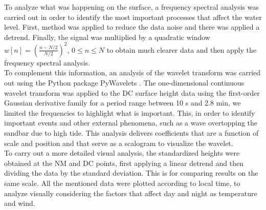 \documentclass[tesis.tex]{subfiles}
\begin{document}
To analyze what was happening on the surface, a frequency spectral analysis was carried out in order to identify the most important processes that affect the water level. First, \cite{welch1967use} method was applied to reduce the data noise and there was applied a detrend. Finally, the signal was multiplied by a quadratic window $w[n]=\left( \frac{n-N/2}{N/2} \right)^2$, $0 \leq n \leq N$ to obtain much clearer data and then apply the frequency spectral analysis. \\

To complement this information, an analysis of the wavelet transform was carried out using the Python package PyWavelets \citep{lee2019pywavelets}. The one-dimensional continuous wavelet transform was applied to the DC surface height data using the first-order Gaussian derivative family for a period range between 10 s and 2.8 min, we limited the frequencies to highlight what is important. This, in order to identify important events and other external phenomena, such as a wave overtopping the sandbar due to high tide. This analysis delivers coefficients that are a function of scale and position and that serve as a scalogram to visualize the wavelet.\\

To carry out a more detailed visual analysis, the standardized heights were obtained at the NM and DC points, first applying a linear detrend and then dividing the data by the standard deviation. This is for comparing results on the same scale. All the mentioned data were plotted according to local time, to analyze visually considering the factors that affect day and night as temperature and wind.
\end{document}
